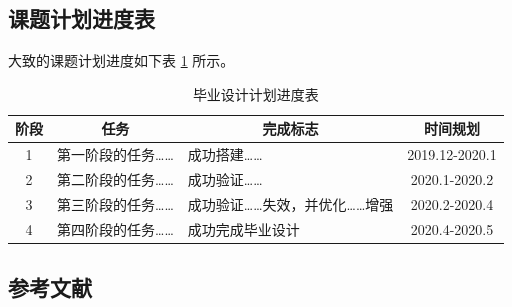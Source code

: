 \documentclass{article}
\begin{document}
\subsection{课题计划进度表}
大致的课题计划进度如下表 \ref{tab:progress} 所示。

\begin{table}[!ht]
  \centering
  \caption{毕业设计计划进度表}
  \label{tab:progress}
  \begin{tabular}{@{}cllc@{}}
    \toprule
    阶段 & \multicolumn{1}{c}{任务} & \multicolumn{1}{c}{完成标志} & 时间规划       \\ \midrule
    1    & 第一阶段的任务……          & 成功搭建……                    & 2019.12-2020.1 \\ \midrule
    2    & 第二阶段的任务……          & 成功验证……                    & 2020.1-2020.2  \\ \midrule
    3    & 第三阶段的任务……          & 成功验证……失效，并优化……增强  & 2020.2-2020.4  \\ \midrule
    4    & 第四阶段的任务……          & 成功完成毕业设计              & 2020.4-2020.5  \\ \bottomrule
  \end{tabular}
\end{table}


\newpage
\setcounter{secnumdepth}{0}  %
\begin{center}
    \section{参考文献}
\end{center}


\printbibliography[heading=none]
\end{document}
